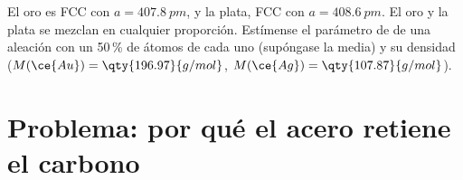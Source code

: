 \begin{exercise}[$\star\star\star$]\label{exo:b1:crystals-metals:12}
El oro es FCC con $a = \qty{407.8}{pm}$, y la plata, FCC con
$a = \qty{408.6}{pm}$. El oro y la plata se mezclan en cualquier
proporción. Estímense el parámetro de  de una aleación con un 50\,\%
de átomos de cada uno (supóngase la media) y su densidad
($M(\ce{Au}) = \qty{196.97}{g/mol}$,
$M(\ce{Ag}) = \qty{107.87}{g/mol}$).
\end{exercise}

\section{Problema: por qué el acero retiene el carbono}

